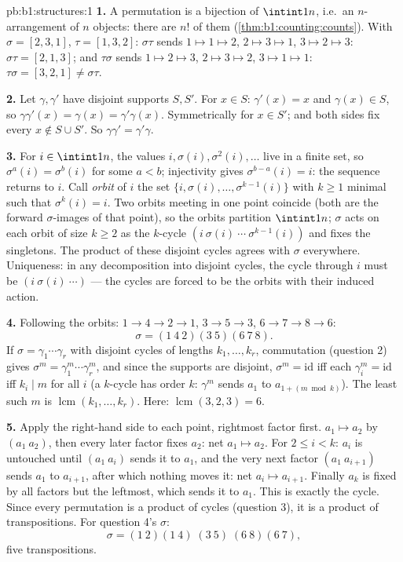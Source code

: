 \begin{solution}{pb:b1:structures:1}
\textbf{1.} A permutation is a bijection of $\intint1n$, i.e.\ an
$n$-arrangement of $n$ objects: there are $n!$ of them
(\cref{thm:b1:counting:counts}). With $\sigma = [2,3,1]$, $\tau =
[1,3,2]$: $\sigma\tau$ sends $1 \mapsto 1 \mapsto 2$, $2 \mapsto 3
\mapsto 1$, $3 \mapsto 2 \mapsto 3$: $\sigma\tau = [2,1,3]$; and
$\tau\sigma$ sends $1 \mapsto 2 \mapsto 3$, $2 \mapsto 3 \mapsto
2$, $3 \mapsto 1 \mapsto 1$: $\tau\sigma = [3,2,1] \neq
\sigma\tau$.

\textbf{2.} Let $\gamma, \gamma'$ have disjoint supports $S, S'$.
For $x \in S$: $\gamma'(x) = x$ and $\gamma(x) \in S$, so
$\gamma\gamma'(x) = \gamma(x) = \gamma'\gamma(x)$. Symmetrically
for $x \in S'$; and both sides fix every $x \notin S \cup S'$. So
$\gamma\gamma' = \gamma'\gamma$.

\textbf{3.} For $i \in \intint1n$, the values $i, \sigma(i),
\sigma^2(i), \dots$ live in a finite set, so $\sigma^a(i) =
\sigma^b(i)$ for some $a < b$; injectivity gives $\sigma^{b-a}(i)
= i$: the sequence returns to $i$. Call \emph{orbit} of $i$ the
set $\{i, \sigma(i), \dots, \sigma^{k-1}(i)\}$ with $k \geq 1$
minimal such that $\sigma^k(i) = i$. Two orbits meeting in one
point coincide (both are the forward $\sigma$-images of that
point), so the orbits partition $\intint1n$; $\sigma$ acts on each
orbit of size $k \geq 2$ as the $k$-cycle $(i\ \sigma(i)\ \cdots\
\sigma^{k-1}(i))$ and fixes the singletons. The product of these
disjoint cycles agrees with $\sigma$ everywhere. Uniqueness: in
any decomposition into disjoint cycles, the cycle through $i$ must
be $(i\ \sigma(i)\ \cdots)$ --- the cycles are forced to be the
orbits with their induced action.

\textbf{4.} Following the orbits: $1 \to 4 \to 2 \to 1$, $3 \to 5
\to 3$, $6 \to 7 \to 8 \to 6$:
\[
\sigma = (1\ 4\ 2)(3\ 5)(6\ 7\ 8) .
\]
If $\sigma = \gamma_1\cdots\gamma_r$ with disjoint cycles of
lengths $k_1, \dots, k_r$, commutation (question 2) gives
$\sigma^m = \gamma_1^m\cdots\gamma_r^m$, and since the supports
are disjoint, $\sigma^m = \mathrm{id}$ iff each $\gamma_i^m =
\mathrm{id}$ iff $k_i \mid m$ for all $i$ (a $k$-cycle has order
$k$: $\gamma^m$ sends $a_1$ to $a_{1 + (m \bmod k)}$). The least
such $m$ is $\operatorname{lcm}(k_1, \dots, k_r)$. Here:
$\operatorname{lcm}(3, 2, 3) = 6$.

\textbf{5.} Apply the right-hand side to each point, rightmost
factor first. $a_1 \mapsto a_2$ by $(a_1\ a_2)$, then every later
factor fixes $a_2$: net $a_1 \mapsto a_2$. For $2 \leq i < k$:
$a_i$ is untouched until $(a_1\ a_i)$ sends it to $a_1$, and the
very next factor $(a_1\ a_{i+1})$ sends $a_1$ to $a_{i+1}$, after
which nothing moves it: net $a_i \mapsto a_{i+1}$. Finally $a_k$
is fixed by all factors but the leftmost, which sends it to $a_1$.
This is exactly the cycle. Since every permutation is a product of
cycles (question 3), it is a product of transpositions. For
question 4's $\sigma$:
\[
\sigma = (1\ 2)(1\ 4)\;(3\ 5)\;(6\ 8)(6\ 7),
\]
five transpositions.


\end{solution}
